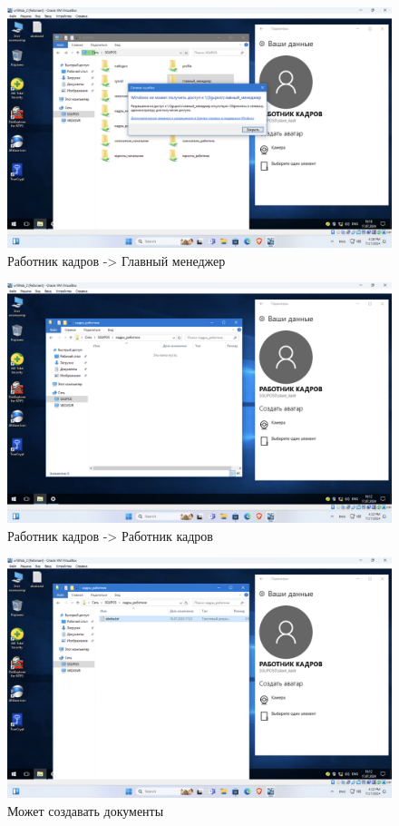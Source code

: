 \begin{figure}[H]
  \centering
  \includegraphics[width=1\textwidth]{pict/prac/31}
  \caption{Работник кадров -> Главный менеджер}
  \label{fig:30}
\end{figure}

\begin{figure}[H]
  \centering
  \includegraphics[width=1\textwidth]{pict/prac/28}
  \caption{Работник кадров -> Работник кадров}
  \label{fig:27}
\end{figure}


\begin{figure}[H]
  \centering
  \includegraphics[width=1\textwidth]{pict/prac/29}
  \caption{Может создавать документы}
  \label{fig:28}
\end{figure}


